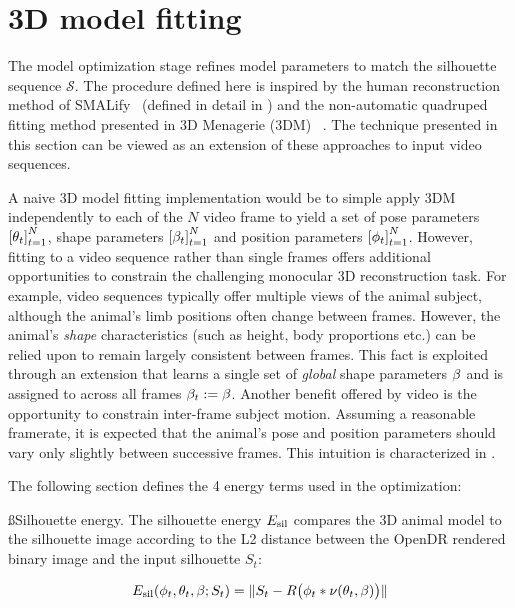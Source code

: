 
\section{3D model fitting}
The model optimization stage refines model parameters to match the silhouette sequence $\mathcal S$. The procedure defined here is inspired by the human reconstruction method of SMALify~\cite{bogo16keep} (defined in detail in ) and the non-automatic quadruped fitting method presented in 3D Menagerie (3DM) ~\cite{zuffi2017menagerie}. The technique presented in this section can be viewed as an extension of these approaches to input video sequences. 

A naive 3D model fitting implementation would be to simple apply 3DM independently to each of the $N$ video frame to yield a set of pose parameters $\left[{\theta_{t}}\right]_{t=1}^{N}$, shape parameters $\left[{\beta_{t}}\right]_{t=1}^{N}$ and position parameters $\left[{\phi_{t}}\right]_{t=1}^{N}$. However, fitting to a video sequence rather than single frames offers additional opportunities to constrain the challenging monocular 3D reconstruction task. For example, video sequences typically offer multiple views of the animal subject, although the animal's limb positions often change between frames. However, the animal's \emph{shape} characteristics (such as height, body proportions etc.) can be relied upon to remain largely consistent between frames. This fact is exploited through an extension that learns a single set of \emph{global} shape parameters $\beta$ and is assigned to across all frames $\beta_{t} := \beta$. Another benefit offered by video is the opportunity to constrain inter-frame subject motion. Assuming a reasonable framerate, it is expected that the animal's pose and position parameters should vary only slightly between successive frames. This intuition is characterized in .

The following section defines the 4 energy terms used in the optimization: 

\ss{Silhouette energy.}
The silhouette energy $E_\textrm{sil}$ compares the 3D animal model to the silhouette image according to the L2 distance between the OpenDR rendered binary image and the input silhouette $S_{t}$:

\begin{equation}
E_\textrm{sil}(\phi_{t}, \theta_{t}, \beta; S_{t}) = \lVert S_{t} - R\bigl(\phi_{t} * \nu(\theta_{t}, \beta)\bigr) \rVert
\end{equation}

